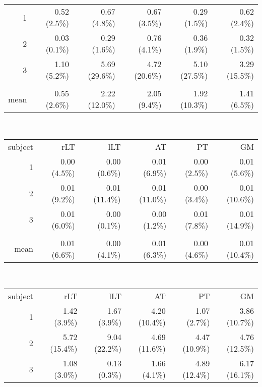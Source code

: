 \begin{table}[p]
\begin{tableframe}
\begin{adjustbox}{width={0.75\textwidth},keepaspectratio}
\begin{minipage}{\linewidth}
{\begin{minipage}{\linewidth}
\begin{tabular}{rrrrrr}
		            \midrule
		            1     & 0.52 (2.5\%) & 0.67 (4.8\%) & 0.67 (3.5\%) & 0.29 (1.5\%) & 0.62 (2.4\%) \\
		            2     & 0.03 (0.1\%) & 0.29 (1.6\%) & 0.76 (4.1\%) & 0.36 (1.9\%) & 0.32 (1.5\%) \\
		            3     & 1.10 (5.2\%) & 5.69 (29.6\%) & 4.72 (20.6\%) & 5.10 (27.5\%) & 3.29 (15.5\%) \\
		                  &       &       &       &       &  \\
		            mean  & 0.55 (2.6\%) & 2.22 (12.0\%) & 2.05 (9.4\%) & 1.92 (10.3\%) & 1.41 (6.5\%) \\
		            \bottomrule
		        \end{tabular}%
			\\[0.5ex]
		        \begin{tabular}{rrrrrr}
		            \addlinespace
				\multicolumn{6}{c}{\textbf{P0$_{z}$}}\\
		            \toprule
		            subject & rLT   & lLT   & AT    & PT    & GM \\
		            \midrule
		            1     & 0.00 (4.5\%) & 0.00 (0.6\%) & 0.01 (6.9\%) & 0.00 (2.5\%) & 0.01 (5.6\%) \\
		            2     & 0.01 (9.2\%) & 0.01 (11.4\%) & 0.01 (11.0\%) & 0.00 (3.4\%) & 0.01 (10.6\%) \\
		            3     & 0.01 (6.0\%) & 0.00 (0.1\%) & 0.00 (1.2\%) & 0.01 (7.8\%) & 0.01 (14.9\%) \\
		                  &       &       &       &       &  \\
		            mean  & 0.01 (6.6\%) & 0.00 (4.1\%) & 0.01 (6.3\%) & 0.00 (4.6\%) & 0.01 (10.4\%) \\
		            \bottomrule
		        \end{tabular}%
		        \\[0.5ex]
		        \begin{tabular}{rrrrrr}
		            \addlinespace
				\multicolumn{6}{c}{\textbf{FWHM$_{z}$}}\\		
		            \toprule
		            subject & rLT   & lLT   & AT    & PT    & GM \\
		            \midrule
		            1     & 1.42 (3.9\%) & 1.67 (3.9\%) & 4.20 (10.4\%) & 1.07 (2.7\%) & 3.86 (10.7\%) \\
		            2     & 5.72 (15.4\%) & 9.04 (22.2\%) & 4.69 (11.6\%) & 4.47 (10.9\%) & 4.76 (12.5\%) \\
		            3     & 1.08 (3.0\%) & 0.13 (0.3\%) & 1.66 (4.1\%) & 4.89 (12.4\%) & 6.17 (16.1\%) \\

\end{tabular}
\end{minipage}}
\end{minipage}
\end{adjustbox}
\end{tableframe}
\end{table}
